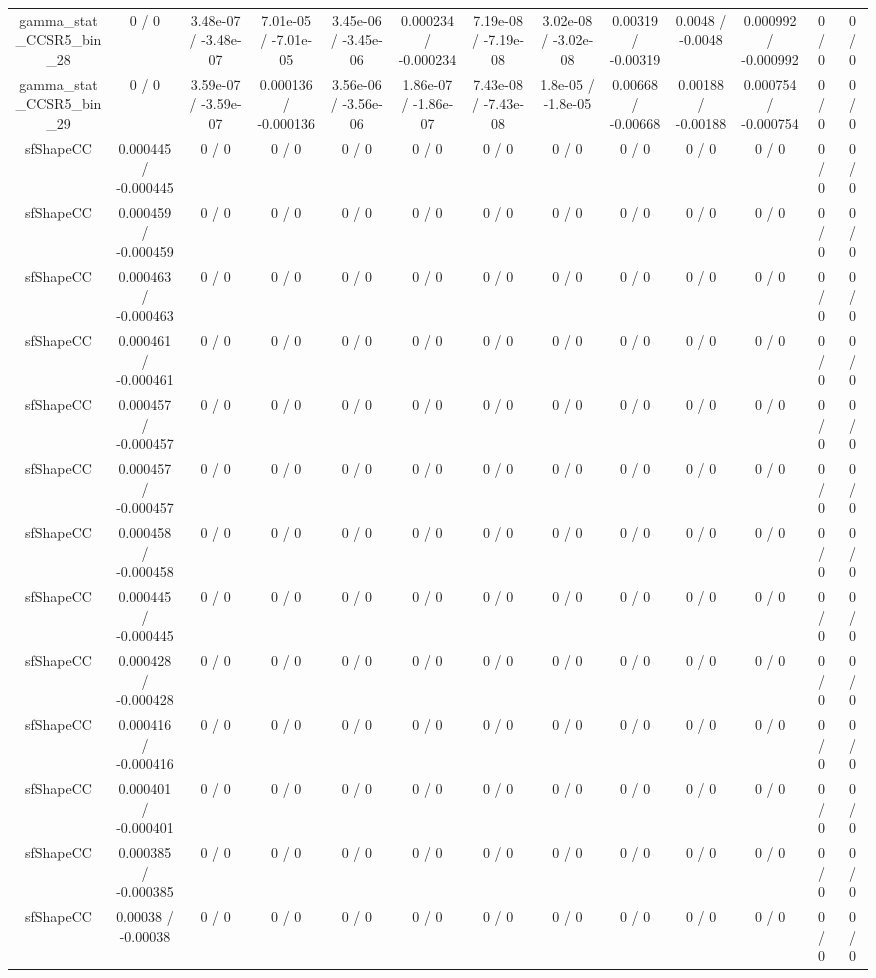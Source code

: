 \documentclass[10pt]{article}
\begin{document}
\begin{table}[htbp]
\begin{center}
\begin{tabular}{|c|c|c|c|c|c|c|c|c|c|c|c|c|}
  gamma_stat_CCSR5_bin_28 & 0 / 0 & 3.48e-07 / -3.48e-07 & 7.01e-05 / -7.01e-05 & 3.45e-06 / -3.45e-06 & 0.000234 / -0.000234 & 7.19e-08 / -7.19e-08 & 3.02e-08 / -3.02e-08 & 0.00319 / -0.00319 & 0.0048 / -0.0048 & 0.000992 / -0.000992 & 0 / 0 & 0 / 0 \\ 
  gamma_stat_CCSR5_bin_29 & 0 / 0 & 3.59e-07 / -3.59e-07 & 0.000136 / -0.000136 & 3.56e-06 / -3.56e-06 & 1.86e-07 / -1.86e-07 & 7.43e-08 / -7.43e-08 & 1.8e-05 / -1.8e-05 & 0.00668 / -0.00668 & 0.00188 / -0.00188 & 0.000754 / -0.000754 & 0 / 0 & 0 / 0 \\ 
  sfShapeCC & 0.000445 / -0.000445 & 0 / 0 & 0 / 0 & 0 / 0 & 0 / 0 & 0 / 0 & 0 / 0 & 0 / 0 & 0 / 0 & 0 / 0 & 0 / 0 & 0 / 0 \\ 
  sfShapeCC & 0.000459 / -0.000459 & 0 / 0 & 0 / 0 & 0 / 0 & 0 / 0 & 0 / 0 & 0 / 0 & 0 / 0 & 0 / 0 & 0 / 0 & 0 / 0 & 0 / 0 \\ 
  sfShapeCC & 0.000463 / -0.000463 & 0 / 0 & 0 / 0 & 0 / 0 & 0 / 0 & 0 / 0 & 0 / 0 & 0 / 0 & 0 / 0 & 0 / 0 & 0 / 0 & 0 / 0 \\ 
  sfShapeCC & 0.000461 / -0.000461 & 0 / 0 & 0 / 0 & 0 / 0 & 0 / 0 & 0 / 0 & 0 / 0 & 0 / 0 & 0 / 0 & 0 / 0 & 0 / 0 & 0 / 0 \\ 
  sfShapeCC & 0.000457 / -0.000457 & 0 / 0 & 0 / 0 & 0 / 0 & 0 / 0 & 0 / 0 & 0 / 0 & 0 / 0 & 0 / 0 & 0 / 0 & 0 / 0 & 0 / 0 \\ 
  sfShapeCC & 0.000457 / -0.000457 & 0 / 0 & 0 / 0 & 0 / 0 & 0 / 0 & 0 / 0 & 0 / 0 & 0 / 0 & 0 / 0 & 0 / 0 & 0 / 0 & 0 / 0 \\ 
  sfShapeCC & 0.000458 / -0.000458 & 0 / 0 & 0 / 0 & 0 / 0 & 0 / 0 & 0 / 0 & 0 / 0 & 0 / 0 & 0 / 0 & 0 / 0 & 0 / 0 & 0 / 0 \\ 
  sfShapeCC & 0.000445 / -0.000445 & 0 / 0 & 0 / 0 & 0 / 0 & 0 / 0 & 0 / 0 & 0 / 0 & 0 / 0 & 0 / 0 & 0 / 0 & 0 / 0 & 0 / 0 \\ 
  sfShapeCC & 0.000428 / -0.000428 & 0 / 0 & 0 / 0 & 0 / 0 & 0 / 0 & 0 / 0 & 0 / 0 & 0 / 0 & 0 / 0 & 0 / 0 & 0 / 0 & 0 / 0 \\ 
  sfShapeCC & 0.000416 / -0.000416 & 0 / 0 & 0 / 0 & 0 / 0 & 0 / 0 & 0 / 0 & 0 / 0 & 0 / 0 & 0 / 0 & 0 / 0 & 0 / 0 & 0 / 0 \\ 
  sfShapeCC & 0.000401 / -0.000401 & 0 / 0 & 0 / 0 & 0 / 0 & 0 / 0 & 0 / 0 & 0 / 0 & 0 / 0 & 0 / 0 & 0 / 0 & 0 / 0 & 0 / 0 \\ 
  sfShapeCC & 0.000385 / -0.000385 & 0 / 0 & 0 / 0 & 0 / 0 & 0 / 0 & 0 / 0 & 0 / 0 & 0 / 0 & 0 / 0 & 0 / 0 & 0 / 0 & 0 / 0 \\ 
  sfShapeCC & 0.00038 / -0.00038 & 0 / 0 & 0 / 0 & 0 / 0 & 0 / 0 & 0 / 0 & 0 / 0 & 0 / 0 & 0 / 0 & 0 / 0 & 0 / 0 & 0 / 0 \\ 

\end{tabular}
\end{center}
\end{table}
\end{document}
